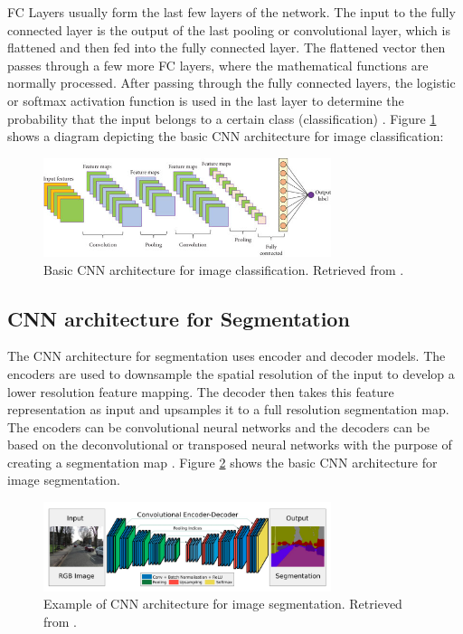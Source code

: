 \ac{FC} Layers usually form the last few layers of the network. The input to the fully connected layer is the output of the last pooling or convolutional layer, which is flattened and then fed into the fully connected layer. The flattened vector then passes through a few more \ac{FC} layers, where the mathematical functions are normally processed. After passing through the fully connected layers, the logistic or softmax activation function is used in the last layer to determine the probability that the input belongs to a certain class (classification) \cite{guide:cnn}. Figure \ref{fig:cnn_class} shows a diagram depicting the basic \ac{CNN} architecture for image classification:

\begin{figure}[!htb]
  \centering
  \includegraphics[width=0.75\textwidth]{Images/cnn_class.jpg}
  \caption[Basic \ac{CNN} architecture for image classification.]{Basic \ac{CNN} architecture for image classification. Retrieved from \cite{image:CNN}.}
  \label{fig:cnn_class}
\end{figure}

\subsection{CNN architecture for Segmentation}

The \ac{CNN} architecture for segmentation uses encoder and decoder models. The encoders are used to downsample the spatial resolution of the input to develop a lower resolution feature mapping. The decoder then takes this feature representation as input and upsamples it to a full resolution segmentation map. The encoders can be convolutional neural networks and the decoders can be based on the deconvolutional or transposed neural networks with the purpose of creating a segmentation map \cite{enconders}. Figure \ref{fig:cnn_seg} shows the basic \ac{CNN} architecture for image segmentation.

\begin{figure}[!htb]
  \centering
  \includegraphics[width=0.75\textwidth]{Images/seg_cnn.jpg}
  \caption[Example of \ac{CNN} architecture for image segmentation.]{Example of \ac{CNN} architecture for image segmentation. Retrieved from \cite{segnet}.}
  \label{fig:cnn_seg}
\end{figure}

